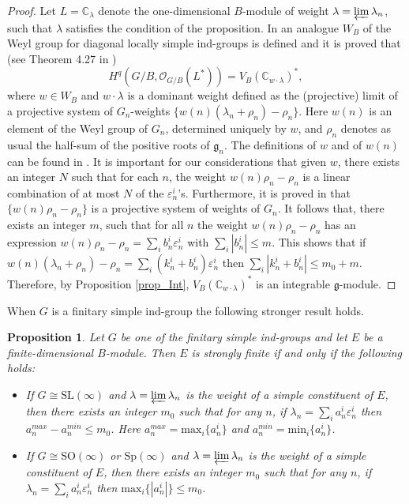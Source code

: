 \documentclass[12pt]{article}
\newcommand{\SL} {\mathrm{SL}}
\newcommand{\SO} {\mathrm{SO}}
\newcommand{\Sp} {\mathrm{Sp}}
\def\CC {{\mathbb C}}     %
\def \OO {{\mathcal O}}
\def \g {\mathfrak{g}}
\newtheorem{prop}[theorem]{Proposition}
\begin{document}
\begin{proof}
Let $L = \CC_{\lambda}$ denote the one-dimensional $B$-module of weight $\lambda = \varprojlim \lambda_n$, such that $\lambda$ satisfies the condition of the proposition. In \cite{DP} an analogue $W_B$ of the Weyl group for diagonal locally simple ind-groups is defined and it is proved that (see Theorem 4.27 in \cite{DP})
$$
H^q(G/B, \OO_{G/B}(L^*)) = V_B(\CC_{w \cdot \lambda})^*,
$$
where $w \in W_B$ and $w\cdot \lambda$ is a dominant weight defined as the (projective) limit of a projective system of $G_n$-weights $\{w(n)(\lambda_n + \rho_n) - \rho_n\}$. Here $w(n)$ is an element of the Weyl group of $G_n$, determined uniquely by $w$, and $\rho_n$ denotes as usual the half-sum of the positive roots of $\g_n$. The definitions of $w$ and of $w(n)$ can be found in \cite{DP}. It is important for our considerations that given $w$, there exists an integer $N$ such that %
for each $n$, the weight $w(n)\rho_n - \rho_n$ is a linear combination of at most $N$ of the $\varepsilon_n^i$'s. Furthermore, it is proved in \cite{DP} that $\{w(n)\rho_n - \rho_n\}$ is a projective system of weights of $G_n$. It follows that, there exists an integer $m$, such that for all $n$ the weight $w(n)\rho_n - \rho_n$ has an expression $w(n)\rho_n - \rho_n = \sum_i b_n^i \varepsilon_n^i$ with $\sum_i |b_n^i| \leq m$. This shows that if
$w(n)(\lambda_n + \rho_n) - \rho_n = \sum_i (k_n^i + b_n^i) \varepsilon_n^i
$
then 
$\sum_i |k_n^i + b_n^i| \leq m_0 + m.
$
Therefore, by Proposition \ref{prop_Int}, $V_B(\CC_{w \cdot \lambda})^*$ is an integrable $\g$-module. 
\end{proof}

When $G$ is a finitary simple ind-group the following stronger result holds.
\begin{prop}
Let $G$ be one of the finitary simple ind-groups and let $E$ be a finite-dimensional $B$-module. Then $E$ is strongly finite if and only if the following holds: 
\begin{itemize}
\item If $G \cong \SL(\infty)$ and $\lambda = \varprojlim \lambda_n$ is the weight of a simple constituent of $E$, then there exists an integer $m_0$ such that for any $n$, if $\lambda_n = \sum_i a_n^i \varepsilon_n^i$ then $a_n^{max} - a_n^{min} \leq m_0$. Here $a_n^{max} = \mathrm{max}_i\{a_n^i\}$ and $a_n^{min} = \mathrm{min}_i\{a_n^i\}$.
\item If $G \cong \SO(\infty)$ or $\Sp(\infty)$ and $\lambda = \varprojlim \lambda_n$ is the weight of a simple constituent of $E$, then there exists an integer $m_0$ such that for any $n$, if $\lambda_n = \sum_i a_n^i \varepsilon_n^i$ then $\mathrm{max}_i\{|a_n^i|\} \leq m_0$.
\end{itemize}
\end{prop}
\end{document}
